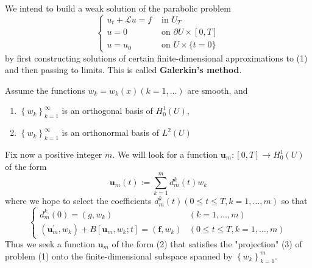 \begin{definition}
    We intend to build a weak solution of the parabolic problem
    \begin{equation}
        \left\{\begin{aligned}
            u_t+\mathcal{L} u=f & \text { in } U_T                     \\
            u=0                 & \text { on } \partial U \times[0, T] \\
            u=u_0               & \text { on } U \times\{t=0\}
        \end{aligned}\right.
    \end{equation}
    by first constructing solutions of certain finite-dimensional approximations to (1) and then passing to limits. This is called \textbf{Galerkin's method}.

    Assume the functions $w_k=w_k(x)(k=1, \ldots)$ are smooth, and
    \begin{enumerate}[label=(\roman*)]
        \item

              $\left\{w_k\right\}_{k=1}^{\infty} $ is an orthogonal basis of  $H_0^1(U)$,
        \item

              $\left\{w_k\right\}_{k=1}^{\infty}$  is an orthonormal basis of $L^2(U)$
    \end{enumerate}
    Fix now a positive integer $m$. We will look for a function $\mathbf{u}_m:[0, T] \rightarrow H_0^1(U)$ of the form
    \begin{equation}
        \mathbf{u}_m(t):=\sum_{k=1}^m d_m^k(t) w_k
    \end{equation}
    where we hope to select the coefficients $d_m^k(t)(0 \leq t \leq T, k=1, \ldots, m)$ so that
    \begin{equation}
        \begin{cases}
            d_m^k(0)=\left(g, w_k\right)                                                                             & (k=1, \ldots, m)                  \\
            \left(\mathbf{u}_m^{\prime}, w_k\right)+B\left[\mathbf{u}_m, w_k ; t\right]=\left(\mathbf{f}, w_k\right) & (0 \leq t \leq T, k=1, \ldots, m)
        \end{cases}
    \end{equation}
    Thus we seek a function $\mathbf{u}_m$ of the form (2) that satisfies the "projection" (3) of problem (1) onto the finite-dimensional subspace spanned by $\left\{w_k\right\}_{k=1}^m$.
\end{definition}


